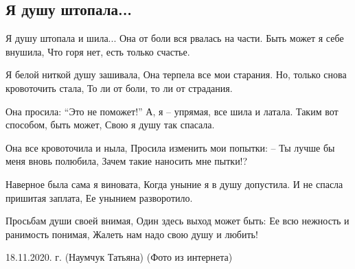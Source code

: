  
 
 

\subsection{Я душу штопала...}

\obeycr
Я душу штопала и шила...
Она от боли вся рвалась на части.
Быть может я себе внушила,
Что горя нет, есть только счастье.

Я белой ниткой душу зашивала,
Она терпела все мои старания.
Но, только снова кровоточить стала,
То ли от боли, то ли от страдания.

Она просила: \enquote{Это не поможет!}
А, я -- упрямая, все шила и латала.
Таким вот способом, быть может,
Свою я душу  так спасала.

Она все кровоточила и ныла,
Просила изменить мои попытки:
-- Ты лучше бы меня вновь полюбила,
Зачем такие наносить мне пытки!?

Наверное была сама я виновата,
Когда уныние я в душу допустила.
И не спасла пришитая заплата,
Ее унынием разворотило.

Просьбам души своей внимая,
Один здесь выход может быть:
Ее всю нежность и ранимость понимая,
Жалеть нам надо свою душу и любить!

18.11.2020. г. (Наумчук Татьяна) 
(Фото из интернета)
\restorecr
